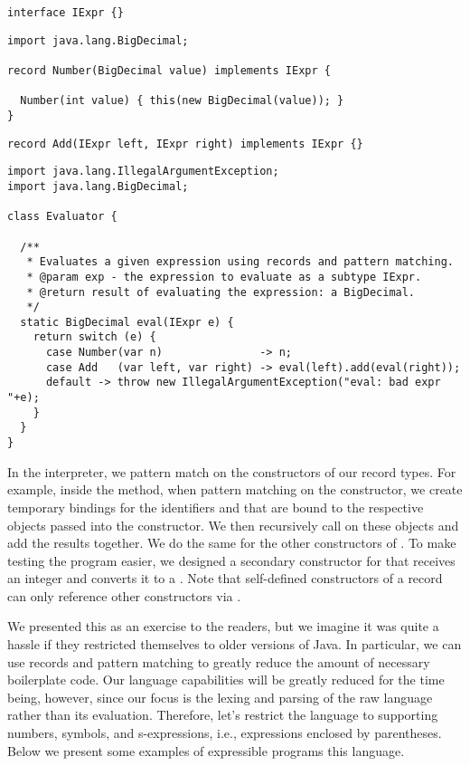 \begin{lstlisting}[language=MyJava]
interface IExpr {}
\end{lstlisting}

\begin{lstlisting}[language=MyJava]
import java.lang.BigDecimal;

record Number(BigDecimal value) implements IExpr {
  
  Number(int value) { this(new BigDecimal(value)); }
}
\end{lstlisting}

\begin{lstlisting}[language=MyJava]
record Add(IExpr left, IExpr right) implements IExpr {}
\end{lstlisting}

\begin{lstlisting}[language=MyJava]
import java.lang.IllegalArgumentException;
import java.lang.BigDecimal;

class Evaluator {

  /**
   * Evaluates a given expression using records and pattern matching.
   * @param exp - the expression to evaluate as a subtype IExpr.
   * @return result of evaluating the expression: a BigDecimal.
   */
  static BigDecimal eval(IExpr e) {
    return switch (e) {
      case Number(var n)               -> n;
      case Add   (var left, var right) -> eval(left).add(eval(right));
      default -> throw new IllegalArgumentException("eval: bad expr "+e);
    }
  }
}
\end{lstlisting}

In the interpreter, we pattern match on the constructors of our record types. 
For example, inside the  method, when pattern matching on the  constructor, we create temporary bindings for the identifiers  and  that are bound to the respective  objects passed into the constructor. 
We then recursively call  on these objects and add the results together. 
We do the same for the other constructors of . 
To make testing the program easier, we designed a secondary constructor for  that receives an integer and converts it to a . 
Note that self-defined constructors of a record can only reference other constructors via .

We presented this as an exercise to the readers, but we imagine it was quite a hassle if they restricted themselves to older versions of Java. 
In particular, we can use records and pattern matching to greatly reduce the amount of necessary boilerplate code. 
Our language capabilities will be greatly reduced for the time being, however, since our focus is the lexing and parsing of the raw language rather than its evaluation. 
Therefore, let's restrict the language to supporting numbers, symbols, and s-expressions, i.e., expressions enclosed by parentheses. 
Below we present some examples of expressible programs this language.

